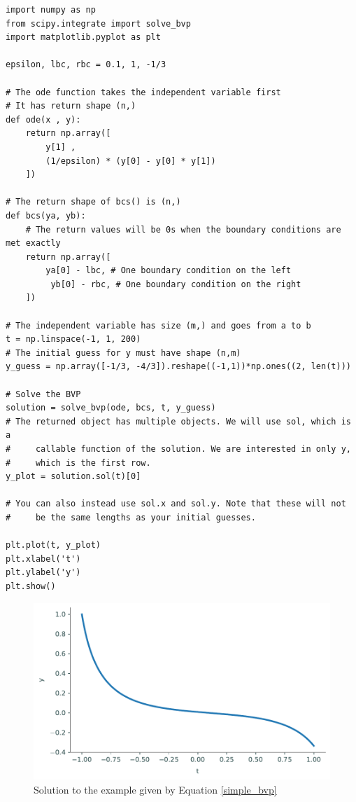 \begin{lstlisting}
import numpy as np
from scipy.integrate import solve_bvp
import matplotlib.pyplot as plt

epsilon, lbc, rbc = 0.1, 1, -1/3

# The ode function takes the independent variable first
# It has return shape (n,)
def ode(x , y):
    return np.array([
        y[1] , 
        (1/epsilon) * (y[0] - y[0] * y[1])
    ])

# The return shape of bcs() is (n,)
def bcs(ya, yb):
    # The return values will be 0s when the boundary conditions are met exactly
    return np.array([
    	ya[0] - lbc, # One boundary condition on the left
         yb[0] - rbc, # One boundary condition on the right
    ])

# The independent variable has size (m,) and goes from a to b
t = np.linspace(-1, 1, 200)
# The initial guess for y must have shape (n,m)
y_guess = np.array([-1/3, -4/3]).reshape((-1,1))*np.ones((2, len(t)))

# Solve the BVP
solution = solve_bvp(ode, bcs, t, y_guess)
# The returned object has multiple objects. We will use sol, which is a
#     callable function of the solution. We are interested in only y, 
#     which is the first row.
y_plot = solution.sol(t)[0]

# You can also instead use sol.x and sol.y. Note that these will not 
#     be the same lengths as your initial guesses.

plt.plot(t, y_plot)
plt.xlabel('t')
plt.ylabel('y')
plt.show()
\end{lstlisting}
\begin{figure}[H]
    \centering
    \includegraphics[width=\textwidth]{figures/bvp_example.pdf}
    \caption{Solution to the example given by Equation \eqref{simple_bvp}}
    \label{bvp_ex}
\end{figure}

